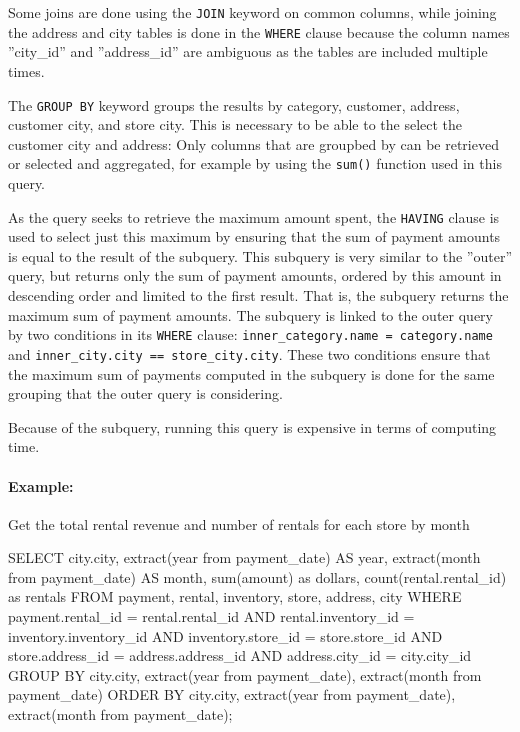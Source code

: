Some joins are done using the \texttt{JOIN} keyword on common columns, while joining the address and city tables is done in the \texttt{WHERE} clause because the column names ''city\_id'' and ''address\_id'' are ambiguous as the tables are included multiple times. 

The \texttt{GROUP BY} keyword groups the results by category, customer, address, customer city, and store city. This is necessary to be able to the select the customer city and address: Only columns that are groupbed by can be retrieved or selected and aggregated, for example by using the \texttt{sum()} function used in this query. 

As the query seeks to retrieve the maximum amount spent, the \texttt{HAVING} clause is used to select just this maximum by ensuring that the sum of payment amounts is equal to the result of the subquery. This subquery is very similar to the ''outer'' query, but returns only the sum of payment amounts, ordered by this amount in descending order and limited to the first result. That is, the subquery returns the maximum sum of payment amounts. The subquery is linked to the outer query by two conditions in its \texttt{WHERE} clause: \texttt{inner\_category.name = category.name} and \texttt{inner\_city.city == store\_city.city}. These two conditions ensure that the maximum sum of payments computed in the subquery is done for the same grouping that the outer query is considering.

Because of the subquery, running this query is expensive in terms of computing time.

\paragraph*{Example:}
Get the total rental revenue and number of rentals for each store by month


\begin{sqlcode}
SELECT city.city, 
       extract(year from payment_date) AS year, 
       extract(month from payment_date) AS month, 
       sum(amount) as dollars, 
       count(rental.rental_id) as rentals
FROM payment, rental, inventory, store, address, city
WHERE payment.rental_id = rental.rental_id AND
      rental.inventory_id = inventory.inventory_id AND
      inventory.store_id = store.store_id AND
      store.address_id = address.address_id AND
      address.city_id = city.city_id
GROUP BY city.city, 
         extract(year from payment_date), 
         extract(month from payment_date)
ORDER BY city.city, 
         extract(year from payment_date), 
         extract(month from payment_date);
\end{sqlcode}

